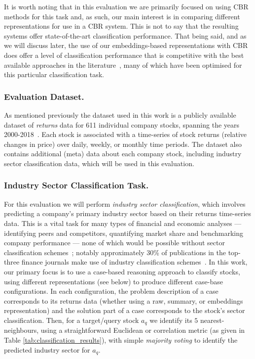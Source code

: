 \documentclass[runningheads]{llncs}
\begin{document}
It is worth noting that in this evaluation we are primarily focused on using CBR methods for this task and, as such, our main interest is in comparing different representations for use in a CBR system. This is not to say that the resulting systems offer state-of-the-art classification performance. That being said, and as we will discuss later, the use of our embeddings-based representations with CBR does offer a level of classification performance that is competitive with the best available approaches in the literature~\cite{sarmah2022learning,dolphin2022embeddings}, many of which have been optimised for this particular classification task.

\subsubsection{Evaluation Dataset.}
As mentioned previously the dataset used in this work is a publicly available dataset of \emph{returns} data for 611 individual company stocks, spanning the years 2000-2018~\cite{dolphin2022embeddings}. Each stock is associated with a time-series of stock returns (relative changes in price) over daily, weekly, or monthly time periods. The dataset also contains additional (meta) data about each company stock, including industry sector classification data, which will be used in this evaluation. %

\subsubsection{Industry Sector Classification Task.}
For this evaluation we will perform \emph{industry sector classification}, which involves predicting a company's primary industry sector based on their returns time-series data. 
This is a vital task for many types of financial and economic analyses --- identifying peers and competitors, quantifying market share and benchmarking company performance --- none of which would be possible without sector classification schemes~\cite{phillips2016industry}; notably approximately 30\% of publications in the top-three finance journals make use of industry classification schemes~\cite{weiner2005impact}. In this work, our primary focus is to use a case-based reasoning approach to classify stocks, using different representations (see below) to produce different case-base configurations. In each configuration, the problem description of a case corresponds to its returns data (whether using a raw, summary, or embeddings representation) and the solution part of a case corresponds to the stock's sector classification. Then, for a target/query stock $a_q$ we identify its $5$ nearest-neighbours, using a straightforward Euclidean or correlation metric (as given in Table \ref{tab:classification_results}), with simple \emph{majority voting} to identify the predicted industry sector for $a_q$.
\end{document}
